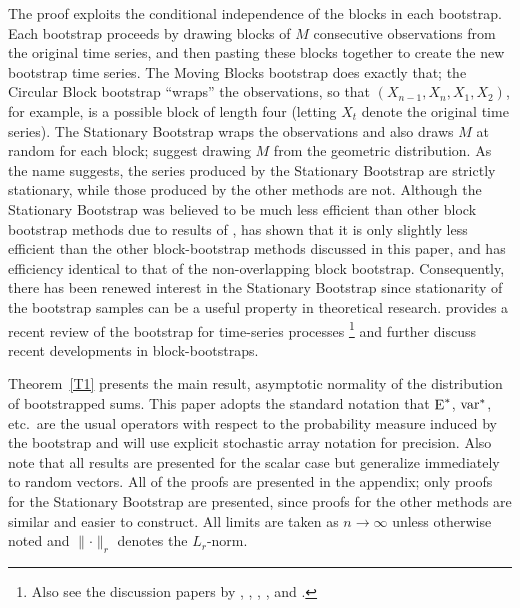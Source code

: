 \documentclass[11pt]{article}
\begin{document}
The proof exploits the conditional independence of the blocks in each
bootstrap.  Each bootstrap proceeds by drawing blocks of $M$
consecutive observations from the original time series, and then
pasting these blocks together to create the new bootstrap time series.
The Moving Blocks bootstrap does exactly that; the Circular Block
bootstrap ``wraps'' the observations, so that $(X_{n-1}, X_n, X_1,
X_2)$, for example, is a possible block of length four (letting $X_t$
denote the original time series).  The Stationary Bootstrap wraps the
observations and also draws $M$ at random for each block;
\citet{PoR:94} suggest drawing $M$ from the geometric distribution.
As the name suggests, the series produced by the Stationary Bootstrap
are strictly stationary, while those produced by the other methods are
not.  Although the Stationary Bootstrap was believed to be much less
efficient than other block bootstrap methods due to results of
\citet{Lah:99}, \citet{Nor:09} has shown that it is only slightly less
efficient than the other block-bootstrap methods discussed in this
paper, and has efficiency identical to that of the non-overlapping
block bootstrap.  Consequently, there has been renewed interest in the
Stationary Bootstrap since stationarity of the bootstrap samples can
be a useful property in theoretical research.  \cite{KrP:11} provides
a recent review of the bootstrap for time-series
processes%
\footnote{Also see the discussion papers by \citet{Dah:11},
\citet{GoP:11}, \citet{Hor:11}, \citet{JeM:11}, and
\citet{KrP:11b}.} %
and \citet{GoP:11} further discuss recent developments in
block-bootstraps.

Theorem~\ref{T1} presents the main result, asymptotic normality of
the distribution of bootstrapped sums. This paper adopts the
standard notation that $\operatorname{E}^{*}$, $\operatorname{var}^{*}$, etc.\ are the usual
operators with respect to the probability measure induced by the
bootstrap and will use explicit stochastic array notation
for precision.  Also note that all results are presented for the
scalar case but generalize immediately to random vectors.  All of the
proofs are presented in the appendix; only proofs for the Stationary
Bootstrap are presented, since proofs for the other methods are
similar and easier to construct.  All limits are taken as $n \to \infty$
unless otherwise noted and $\lVert \cdot \rVert_r$ denotes the
$L_r$-norm.
\end{document}

